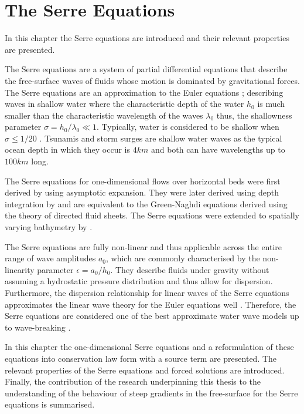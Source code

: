 
\chapter{The Serre Equations}
\label{chp:Serreeqns}
In this chapter the Serre equations are introduced and their relevant properties are presented.

The Serre equations are a system of partial differential equations that describe the free-surface waves of fluids whose motion is dominated by gravitational forces. The Serre equations are an approximation to the Euler equations \cite{Euler-1755-274}; describing waves in shallow water where the characteristic depth of the water $h_0$ is much smaller than the characteristic wavelength of the waves $\lambda_0$ thus, the shallowness parameter $ \sigma = h_0 / \lambda_0  \ll 1 $. Typically, water is considered to be shallow when $\sigma  \le  1/ 20$ \cite{Sorenson-2006}. Tsunamis and storm surges are shallow water waves as the typical ocean depth in which they occur is $4km$ and both can have wavelengths up to $100km$ long.

The Serre equations for one-dimensional flows over horizontal beds were first derived by \citet{Serre-F-1953-857} using asymptotic expansion. They were later derived using depth integration by \citet{Su-Gardener-1969-536} and are equivalent to the Green-Naghdi equations \cite{Green-Naghdi-1976-237} derived using the theory of directed fluid sheets. The Serre equations were extended to spatially varying bathymetry by \citet{Seabra-Santos-etal-1987-117}. 

The Serre equations are fully non-linear and thus applicable across the entire range of wave amplitudes $a_0$, which are commonly characterised by the non-linearity parameter $\epsilon = a_0 / h_0$. They describe fluids under gravity without assuming a hydrostatic pressure distribution and thus allow for dispersion. Furthermore, the dispersion relationship for linear waves of the Serre equations approximates the linear wave theory for the Euler equations well \cite{Barthelemy-2004-315}. Therefore, the Serre equations are considered one of the best approximate water wave models up to wave-breaking \cite{Bonneton-Lannes-2009-16601,Bonneton-etal-2011-1479}. 

In this chapter the one-dimensional Serre equations and a reformulation of these equations into conservation law form with a source term are presented. The relevant properties of the Serre equations and forced solutions are introduced. Finally, the contribution of the research underpinning this thesis \cite{Pitt-2018-61} to the understanding of the behaviour of steep gradients in the free-surface for the Serre equations is summarised. 

